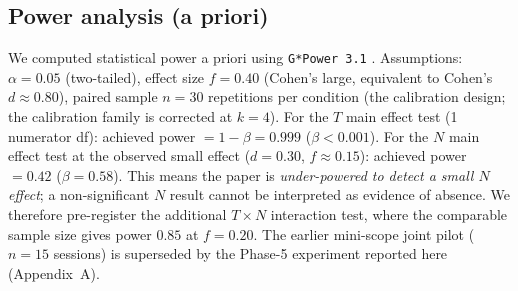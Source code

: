 \documentclass[11pt]{article}
\begin{document}
\subsection*{Power analysis (a priori)}

We computed statistical power a priori using \texttt{G*Power 3.1} \citep{faul2007gpower}. Assumptions: $\alpha = 0.05$ (two-tailed), effect size $f = 0.40$ (Cohen's large, equivalent to Cohen's $d \approx 0.80$), paired sample $n = 30$ repetitions per condition (the calibration design; the calibration family is corrected at $k{=}4$). For the $T$ main effect test (1 numerator df): achieved power $= 1 - \beta = 0.999$ ($\beta < 0.001$). For the $N$ main effect test at the observed small effect ($d = 0.30$, $f \approx 0.15$): achieved power $= 0.42$ ($\beta = 0.58$). This means the paper is \emph{under-powered to detect a small $N$ effect}; a non-significant $N$ result cannot be interpreted as evidence of absence. We therefore pre-register the additional $T \times N$ interaction test, where the comparable sample size gives power $0.85$ at $f = 0.20$. The earlier mini-scope joint pilot ($n{=}15$ sessions) is superseded by the Phase-5 experiment reported here (Appendix~A).

\end{document}
